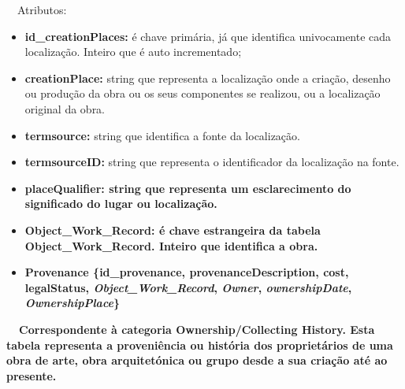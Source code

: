 \documentclass[letterpaper]{article}
\newcommand\textstyleStrongEmphasis[1]{\textbf{#1}}
\newcommand\liststyleLi{%
\renewcommand\labelitemi{{\textbullet}}
\renewcommand\labelitemii{[27A2?]}
\renewcommand\labelitemiii{{\textbullet}}
\renewcommand\labelitemiv{{\textbullet}}
}
\newcommand\liststyleLxiv{%
\renewcommand\labelitemi{[27A2?]}
\renewcommand\labelitemii{[27A2?]}
\renewcommand\labelitemiii{[27A2?]}
\renewcommand\labelitemiv{[27A2?]}
}
\begin{document}
\bigskip

{
\ \ Atributos:}

\liststyleLxiv
\begin{itemize}
\item {
\textbf{id\_creationPlaces: }\'e chave prim\'aria, j\'a que identifica
univocamente cada localiza\c{c}\~ao. Inteiro que \'e auto
incrementado;}
\item {
\textbf{creationPlace: }string que representa a localiza\c{c}\~ao onde a
cria\c{c}\~ao, desenho ou produ\c{c}\~ao da obra ou os seus componentes
se realizou, ou a localiza\c{c}\~ao original da obra.}
\item {
\textbf{termsource: }string que identifica a fonte da
localiza\c{c}\~ao.}
\item {
\textbf{termsourceID:} string que representa o identificador da
localiza\c{c}\~ao na fonte.}
\item {\bfseries
placeQualifier:\textmd{ string que representa um esclarecimento do
significado do lugar ou localiza\c{c}\~ao.}}
\item {\bfseries
Object\_Work\_Record:\textmd{\textit{ }}\textmd{\'e chave estrangeira da
tabela Object\_Work\_Record. Inteiro que identifica a obra.}}
\end{itemize}

\bigskip

\liststyleLi
\begin{itemize}
\item {\bfseries
Provenance\textmd{ \{}\textmd{id\_provenance}\textmd{,
provenanceDescription, cost, legalStatus,
}\textmd{\textit{Object\_Work\_Record}}\textmd{,
}\textmd{\textit{Owner}}\textmd{,
}\textmd{\textit{ownershipDate}}\textmd{,
}\textmd{\textit{OwnershipPlace}}\textmd{\}}}
\end{itemize}
{\bfseries
\foreignlanguage{english}{\textmd{\ \ Correspondente \`a categoria
}}\foreignlanguage{english}{Ownership}\textstyleStrongEmphasis{\foreignlanguage{english}{/Collecting
History}}\foreignlanguage{english}{\textmd{. Esta
}}\textstyleStrongEmphasis{\foreignlanguage{english}{\textmd{tabela}}}\foreignlanguage{english}{\textmd{
representa a proveni\^encia ou hist\'oria dos propriet\'arios de uma
obra de arte, obra arquitet\'onica ou grupo desde a sua cria\c{c}\~ao
at\'e ao presente.}}}


\bigskip
\end{document}

